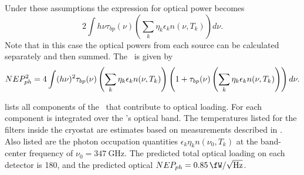 Under these assumptions the expression for optical power becomes
\begin{equation} \label{eqn:ch4-opt-pow-all}
  2 \int h \nu \tau_{bp}(\nu) \left( \sum_k \eta_k \epsilon_k n(\nu,T_k) \right) d \nu.
\end{equation}
Note that in this case the optical powers from each source can be calculated separately and then summed.
The \NEPph\ is given by
\begin{equation} \label{eqn:ch4-nep-all}
  NEP_{ph}^2 = 4 \int (h \nu)^2 \tau_{bp}(\nu) \left( \sum_k \eta_k \epsilon_k n(\nu,T_k) \right) 
       \left( 1 + \tau_{bp}(\nu) \left( \sum_k \eta_k \epsilon_k n(\nu,T_k) \right)  \right) d \nu.
\end{equation}

 lists all components of the \Imager\ that contribute to optical loading.
For each component  is integrated over the \Imager's optical band.
The temperatures listed for the filters inside the cryostat are estimates based on measurements described in .
Also listed are the photon occupation quantities $\epsilon_k \eta_k n(\nu_0,T_k)$ at the band-center frequency of $\nu_0 = \SI{347}{\GHz}$.
The predicted total optical loading on each detector is \SI{180}{\pW}, and the predicted optical $NEP_{ph} = \Pnoisef{0.85}$.

